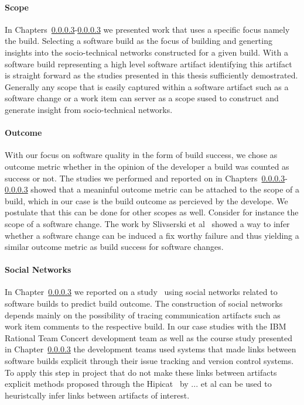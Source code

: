 \paragraph{Scope}
In Chapters~\ref{}-\ref{} we presented work that uses a specific focus namely the build.
Selecting a software build as the focus of building and generting insights into the socio-technical networks constructed for a given build.
With a software build representing a high level software artifact identifying this artifact is straight forward as the studies presented in this thesis sufficiently demostrated.
Generally any scope that is easily captured within a software artifact such as a software change or a work item can server as a scope sused to construct and generate insight from socio-technical networks.

\paragraph{Outcome}
With our focus on software quality in the form of build success, we chose as outcome metric whether in the opinion of the developer a build was counted as success or not.
The studies we performed and reported on in Chapters~\ref{}-\ref{} showed that a meaninful outcome metric can be attached to the scope of a build, which in our case is the build outcome as percieved by the develope.
We postulate that this can be done for other scopes as well.
Consider for instance the scope of a software change.
The work by Slivserski et al~\cite{} showed a way to infer whether a software change can be induced a fix worthy failure and thus yielding a similar outcome metric as build success for software changes. 

\paragraph{Social Networks}
In Chapter~\ref{} we reported on a study~\cite{wolf:icse:2009} using social networks related to software builds to predict build outcome.
The construction of social networks depends mainly on the possibility of tracing communication artifacts such as work item comments to the respective build.
In our case studies with the IBM Rational Team Concert development team as well as the course study presented in Chapter~\ref{} the development teams used systems that made links between software builds explicit through their issue tracking and version control systems.
To apply this step in project that do not make these links between artifacts explicit methods proposed through the Hipicat~\cite{} by ... et al can be used to heuristcally infer links between artifacts of interest.

